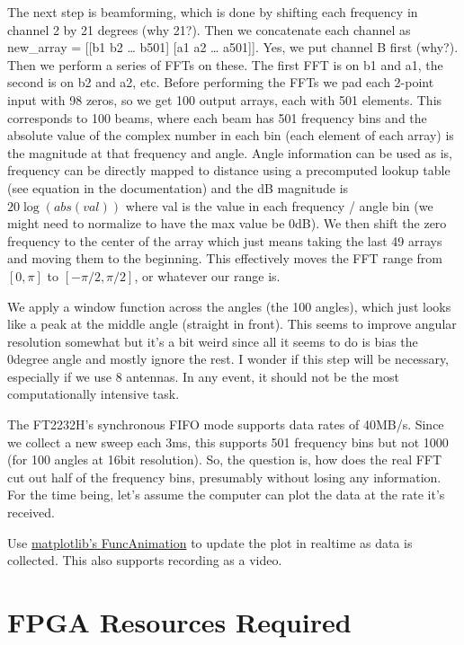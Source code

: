 The next step is beamforming, which is done by shifting each frequency in channel 2 by 21 degrees
(why 21?). Then we concatenate each channel as new_array = [[b1 b2 … b501] [a1 a2 … a501]]. Yes, we
put channel B first (why?). Then we perform a series of FFTs on these. The first FFT is on b1 and
a1, the second is on b2 and a2, etc. Before performing the FFTs we pad each 2-point input with 98
zeros, so we get 100 output arrays, each with 501 elements. This corresponds to 100 beams, where
each beam has 501 frequency bins and the absolute value of the complex number in each bin (each
element of each array) is the magnitude at that frequency and angle. Angle information can be used
as is, frequency can be directly mapped to distance using a precomputed lookup table (see equation
in the documentation) and the dB magnitude is $20\log(abs(val))$ where val is the value in each
frequency / angle bin (we might need to normalize to have the max value be 0dB). We then shift the
zero frequency to the center of the array which just means taking the last 49 arrays and moving them
to the beginning. This effectively moves the FFT range from $[0, \pi]$ to $[-\pi/2, \pi/2]$, or
whatever our range is.

We apply a window function across the angles (the 100 angles), which just looks like a peak at the
middle angle (straight in front). This seems to improve angular resolution somewhat but it's a bit
weird since all it seems to do is bias the 0degree angle and mostly ignore the rest. I wonder if
this step will be necessary, especially if we use 8 antennas. In any event, it should not be the
most computationally intensive task.

The FT2232H's synchronous FIFO mode supports data rates of 40MB/s. Since we collect a new sweep each
3ms, this supports 501 frequency bins but not 1000 (for 100 angles at 16bit resolution). So, the
question is, how does the real FFT cut out half of the frequency bins, presumably without losing any
information. For the time being, let's assume the computer can plot the data at the rate it's
received.

Use
\href{https://matplotlib.org/api/animation_api.html#matplotlib.animation.FuncAnimation}{matplotlib's
FuncAnimation} to update the plot in realtime as data is collected. This also supports recording as
a video.

\section{FPGA Resources Required}
\label{sec:fpga-resources}

